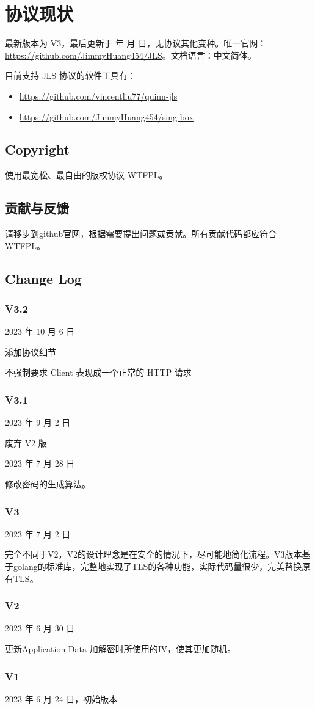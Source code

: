 \renewcommand{\today}{\number\year 年 \number\month 月 \number\day 日}

\chapter{协议现状}

最新版本为 V3，最后更新于 \today，无协议其他变种。唯一官网：\href{https://github.com/JimmyHuang454/JLS}{https://github.com/JimmyHuang454/JLS}。文档语言：中文简体。

目前支持 JLS 协议的软件工具有：
\begin{itemize}
	\item \href{vincentliu77/quinn-jls}{https://github.com/vincentliu77/quinn-jls}
	\item \href{JimmyHuang454/sing-box}{https://github.com/JimmyHuang454/sing-box}
\end{itemize}



\section{Copyright}
使用最宽松、最自由的版权协议 WTFPL。

\section{贡献与反馈}
请移步到github官网，根据需要提出问题或贡献。所有贡献代码都应符合 WTFPL。

\section{Change Log}
\subsection{V3.2}
2023 年 10 月 6 日

添加协议细节

不强制要求 Client 表现成一个正常的 HTTP 请求

\subsection{V3.1}
2023 年 9 月 2 日

废弃 V2 版


2023 年 7 月 28 日

修改密码的生成算法。

\subsection{V3}
2023 年 7 月 2 日

完全不同于V2，V2的设计理念是在安全的情况下，尽可能地简化流程。V3版本基于golang的标准库，完整地实现了TLS的各种功能，实际代码量很少，完美替换原有TLS。

\subsection{V2}
2023 年 6 月 30 日

更新Application Data 加解密时所使用的IV，使其更加随机。


\subsection{V1}
2023 年 6 月 24 日，初始版本

